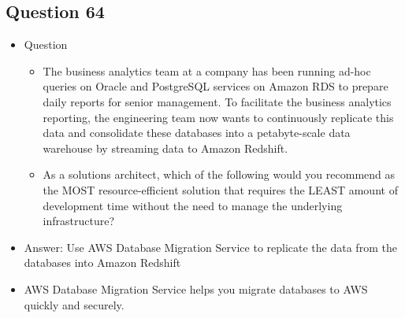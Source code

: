 \documentclass[]{scrartcl}
\begin{document}
\subsection{Question 64}
\begin{itemize}
	\item Question
	\begin{itemize}
		\item The business analytics team at a company has been running ad-hoc queries on Oracle and PostgreSQL services on Amazon RDS to prepare daily reports for senior management. To facilitate the business analytics reporting, the engineering team now wants to continuously replicate this data and consolidate these databases into a petabyte-scale data warehouse by streaming data to Amazon Redshift.
		\item As a solutions architect, which of the following would you recommend as the MOST resource-efficient solution that requires the LEAST amount of development time without the need to manage the underlying infrastructure?
	\end{itemize}
	\item Answer: Use AWS Database Migration Service to replicate the data from the databases into Amazon Redshift
	\item AWS Database Migration Service helps you migrate databases to AWS quickly and securely. 
\end{itemize}
\end{document}
